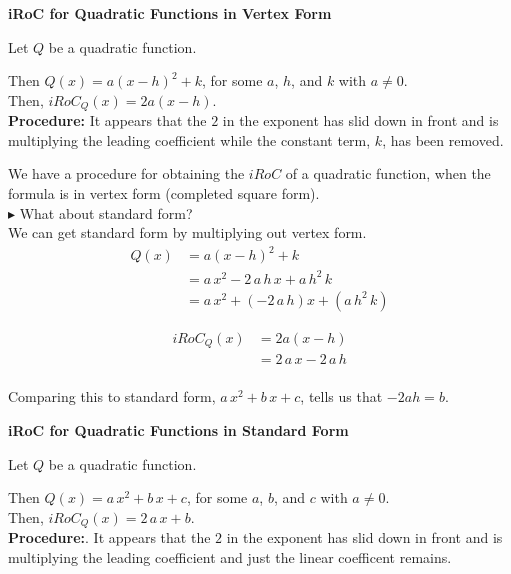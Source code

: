 \documentclass{ximera}
\begin{document}
\begin{procedure} \textbf{\textcolor{blue!75!black}{iRoC for Quadratic Functions in Vertex Form}} 



Let $Q$ be a quadratic function.

Then $Q(x) = a (x - h)^2 + k$, for some $a$, $h$, and $k$ with $a \ne 0$. \\

Then, $iRoC_Q(x) = 2 a (x - h)$. \\


\textbf{Procedure:} It appears that the $2$ in the exponent has slid down in front and is multiplying the leading coefficient while the constant term, $k$, has been removed.



\end{procedure}



We have a procedure for obtaining the $iRoC$ of a quadratic function, when the formula is in vertex form (completed square form). \\

\textbf{\textcolor{blue!55!black}{$\blacktriangleright$}} What about standard form? \\
We can get standard form by multiplying out vertex form. \\



\begin{align*}
Q(x) & = a (x - h)^2 + k \\
     & = a \, x^2 - 2 \, a \, h \, x + a \, h^2 \, k \\
     & = a \, x^2  + (- 2 \, a \, h) x + (a \, h^2 \, k) 
\end{align*}


\begin{align*}
iRoC_Q(x) &= 2 a (x - h) \\
          & = 2 \, a \, x - 2 \, a \, h  \\
\end{align*}


Comparing this to standard form, $a \, x^2 + b \, x + c$, tells us that $-2ah = b$. \\


\begin{procedure} \textbf{\textcolor{blue!75!black}{iRoC for Quadratic Functions in Standard Form}} 



Let $Q$ be a quadratic function.

Then $Q(x) = a \, x^2 + b \, x + c$, for some $a$, $b$, and $c$ with $a \ne 0$. \\

Then, $iRoC_Q(x) = 2 \, a \, x + b$. \\


\textbf{Procedure:}. It appears that the $2$ in the exponent has slid down in front and is multiplying the leading coefficient and just the linear coefficent remains. 



\end{procedure}
\end{document}
